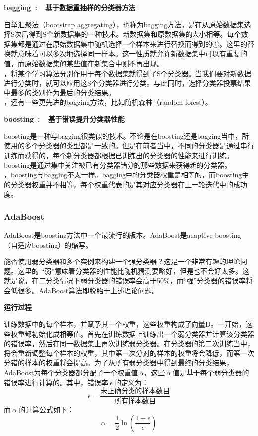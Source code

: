 \noindent\textbf{bagging~:~~基于数据重抽样的分类器方法}

\indent 自举汇聚法（bootstrap aggregating），也称为bagging方法，是在从原始数据集选择S次后得到S个新数据集的一种技术。新数据集和原数据集的大小相等。每个数据集都是通过在原始数据集中随机选择一个样本来进行替换而得到的①。这里的替换就意味着可以多次地选择同一样本。这一性质就允许新数据集中可以有重复的值，而原始数据集的某些值在新集合中则不再出现。\\
，将某个学习算法分别作用于每个数据集就得到了S个分类器。当我们要对新数据进行分类时，就可以应用这S个分类器进行分类。与此同时，选择分类器投票结果中最多的类别作为最后的分类结果。\\
，还有一些更先进的bagging方法，比如随机森林（random forest）。

\noindent\textbf{boosting~:~~基于错误提升分类器性能}

boosting是一种与bagging很类似的技术。不论是在boosting还是bagging当中，所使用的多个分类器的类型都是一致的。但是在前者当中，不同的分类器是通过串行训练而获得的，每个新分类器都根据已训练出的分类器的性能来进行训练。boosting是通过集中关注被已有分类器错分的那些数据来获得新的分类器。\\
，boosting与bagging不太一样。bagging中的分类器权重是相等的，而boosting中的分类器权重并不相等，每个权重代表的是其对应分类器在上一轮迭代中的成功度。

\subsubsection{AdaBoost}
AdaBoost是boosting方法中一个最流行的版本。AdaBoost是adaptive boosting（自适应boosting）的缩写。

能否使用弱分类器和多个实例来构建一个强分类器？这是一个非常有趣的理论问题。这里的
“弱”意味着分类器的性能比随机猜测要略好，但是也不会好太多。这就是说，在二分类情况下弱分类器的错误率会高于50\%，而“强”分类器的错误率将会低很多。AdaBoost算法即脱胎于上述理论问题。

\textbf{运行过程}

训练数据中的每个样本，并赋予其一个权重，这些权重构成了向量D。一开始，这些权重都初始化成相等值。首先在训练数据上训练出一个弱分类器并计算该分类器的错误率，然后在同一数据集上再次训练弱分类器。在分类器的第二次训练当中，将会重新调整每个样本的权重，其中第一次分对的样本的权重将会降低，而第一次分错的样本的权重将会提高。为了从所有弱分类器中得到最终的分类结果，AdaBoost为每个分类器都分配了一个权重值$~\alpha$，这些$~\alpha~$值是基于每个弱分类器的错误率进行计算的。其中，错误率$~\epsilon~$的定义为：
$$\epsilon = \frac{\text{未正确分类的样本数目}}{\text{所有样本数目}}$$
而$~\alpha~$的计算公式如下：
$$\alpha = \frac{1}{2}\ln(\frac{1-\epsilon}{\epsilon})$$

